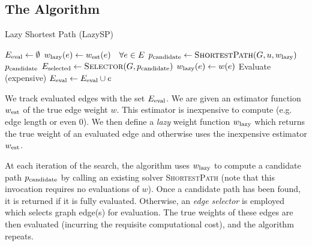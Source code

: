 
\subsection{The Algorithm}

\begin{algorithm}[t]
\caption{Lazy Shortest Path (LazySP)}
\label{alg:lazy-outline}
\begin{algorithmic}[1]
\State $E_{\mbox{\scriptsize eval}} \leftarrow \emptyset$ %
\State $w_{\mbox{\scriptsize lazy}}(e) \leftarrow w_{\mbox{\scriptsize est}}(e) \quad \forall e \in E$ %
\Loop
   \State $p_{\mbox{\scriptsize candidate}} \leftarrow
      \mbox{\sc ShortestPath}(G, u, w_{\mbox{\scriptsize lazy}})$ %
      \label{line:lazy-outline-shortestpath}
      \State \Return $p_{\mbox{\scriptsize candidate}}$ %
   \EndIf
   \State $E_{\mbox{\scriptsize selected}} \leftarrow  \mbox{\sc Selector}(G, p_{\mbox{\scriptsize candidate}})$ %
   \label{line:lazy-outline-chooseedges} 
      \State $w_{\mbox{\scriptsize lazy}}(e) \leftarrow w(e)$ \Comment Evaluate (expensive)
      \State $E_{\mbox{\scriptsize eval}} \leftarrow E_{\mbox{\scriptsize eval}} \cup e$ %
   \EndFor
\EndLoop
\EndFunction
\end{algorithmic}
\end{algorithm}

We track evaluated edges with the set $E_{\mbox{\scriptsize eval}}$.
We are given an estimator function $w_{\mbox{\scriptsize est}}$ of the true edge weight $w$.
This estimator is inexpensive to compute
(e.g. edge length or even $0$).
We then define a \emph{lazy} weight function $w_{\mbox{\scriptsize lazy}}$
which returns the
true weight of an evaluated edge and otherwise
uses the inexpensive estimator $w_{\mbox{\scriptsize est}}$.

At each iteration of the search,
the algorithm uses $w_{\mbox{\scriptsize lazy}}$ to compute a candidate path
$p_{\mbox{\scriptsize candidate}}$
by calling an existing solver \textsc{ShortestPath}
(note that this invocation requires no evaluations of $w$).
Once a candidate path has been found,
it is returned if it is fully evaluated.
Otherwise,
an \emph{edge selector} is employed which selects
graph edge(s) for evaluation.
The true weights of these edges are then evaluated
(incurring the requisite computational cost),
and the algorithm repeats.

